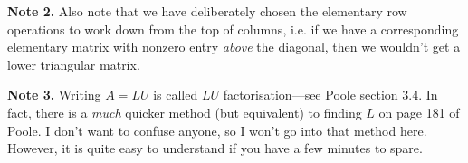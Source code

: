 \documentclass[english,12pt,a4paper]{scrartcl}
\begin{document}
\begin{itemize}
    \textbf{Note 2.} Also note that we have deliberately chosen the elementary 
    row operations to work down from the top of columns, i.e. if we have a 
    corresponding elementary matrix with nonzero entry \emph{above} the 
    diagonal, then we wouldn't get a lower triangular matrix.

    \textbf{Note 3.} Writing $A = LU$ is called $LU$ factorisation---see Poole 
    section 3.4. In fact, there is a \emph{much} quicker method (but 
    equivalent) to finding $L$ on page 181 of Poole. I don't want to confuse 
    anyone, so I won't go into that method here. However, it is quite easy to 
    understand if you have a few minutes to spare.
\end{itemize}
\end{document}
